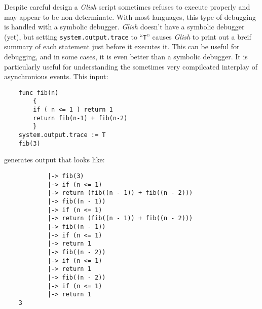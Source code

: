 \label{system-output-trace}
Despite careful design a {\em Glish} script sometimes refuses to execute
properly and may appear to be non-determinate. With most languages, this type of
debugging is handled with a symbolic debugger. {\em Glish} doesn't have a symbolic
debugger (yet), but setting \verb+system.output.trace+ to ``{\tt T}''
causes {\em Glish} to
print out a breif summary of each statement just before it executes it. This can be
useful for debugging, and in some cases, it is even better than a symbolic debugger.
It is particularly useful for understanding the sometimes very compilcated interplay
of asynchronious events. This input:
\begin{verbatim}
    func fib(n)
        {
        if ( n <= 1 ) return 1
        return fib(n-1) + fib(n-2)
        }
    system.output.trace := T   
    fib(3)
\end{verbatim}
generates output that looks like:
\begin{verbatim}
            |-> fib(3)
            |-> if (n <= 1)
            |-> return (fib((n - 1)) + fib((n - 2)))
            |-> fib((n - 1))
            |-> if (n <= 1)
            |-> return (fib((n - 1)) + fib((n - 2)))
            |-> fib((n - 1))
            |-> if (n <= 1)
            |-> return 1
            |-> fib((n - 2))
            |-> if (n <= 1)
            |-> return 1
            |-> fib((n - 2))
            |-> if (n <= 1)
            |-> return 1
    3 
\end{verbatim}
